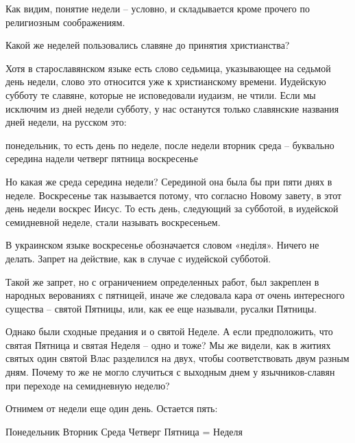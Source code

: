 Как видим, понятие недели – условно, и складывается кроме прочего по религиозным соображениям.

Какой же неделей пользовались славяне до принятия христианства?

Хотя в старославянском языке есть слово седьмица, указывающее на седьмой день недели, слово это относится уже к христианскому времени. Иудейскую субботу те славяне, которые не исповедовали иудаизм, не чтили. Если мы исключим из дней недели субботу, у нас останутся только славянские названия дней недели, на русском это:\newline

\noindent понедельник, то есть день по неделе, после недели\newline
вторник\newline
среда – буквально середина надели\newline
четверг\newline
пятница\newline
воскресенье\newline

   Но какая же среда середина недели? Серединой она была бы при пяти днях в неделе. Воскресенье так называется потому, что согласно Новому завету, в этот день недели воскрес Иисус. То есть день, следующий за субботой, в иудейской семидневной неделе, стали называть воскресеньем.

В украинском языке воскресенье обозначается словом «неділя». Ничего не делать. Запрет на действие, как в случае с иудейской субботой.

   Такой же запрет, но с ограничением определенных работ, был закреплен в народных верованиях с пятницей, иначе же следовала кара от очень интересного существа – святой Пятницы, или, как ее еще называли, русалки Пятницы.

Однако были сходные предания и о святой Неделе. А если предположить, что святая Пятница и святая Неделя – одно и тоже? Мы же видели, как в житиях святых один святой Влас разделился на двух, чтобы соответствовать двум разным дням. Почему то же не могло случиться с выходным днем у язычников-славян при переходе на семидневную неделю?

Отнимем от недели еще один день. Остается пять:\newline 

\noindent Понедельник\newline
Вторник\newline
Среда\newline
Четверг\newline
Пятница = Неделя\newline

